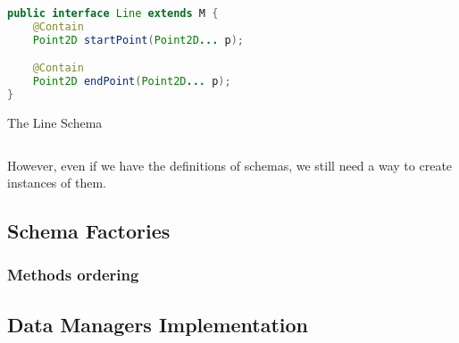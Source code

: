 \begin{sourcecode}[H]
	\begin{lstlisting}[language=Java,escapechar=|]
public interface Line extends M {
	@Contain
	Point2D startPoint(Point2D... p);

	@Contain
	Point2D endPoint(Point2D... p);
}
	\end{lstlisting}
	\caption{The Line Schema}
	\label{lst:Line_Schema_implementation}
\end{sourcecode}


However, even if we have the definitions of schemas, we still need a way to create instances of them.

\subsection{Schema Factories}\label{Schema Factories}


\subsubsection{Methods ordering}\label{Methods ordering}


\subsection{Data Managers Implementation}\label{Data Managers Implementation}





